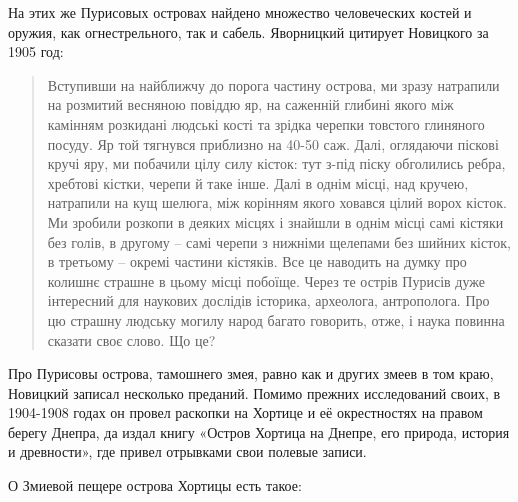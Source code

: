 На этих же Пурисовых островах найдено множество человеческих костей и оружия, как огнестрельного, так и сабель. Яворницкий цитирует Новицкого за 1905 год:

\begin{quotation}
Вступивши на найближчу до порога частину острова, ми зразу натрапили на розмитий весняною повіддю яр, на саженній глибині якого між камінням розкидані людські кості та зрідка черепки товстого глиняного посуду. Яр той тягнувся приблизно на 40-50 саж. Далі, оглядаючи піскові кручі яру, ми побачили цілу силу кісток: тут з-під піску обголились ребра, хребтові кістки, черепи й таке інше. Далі в однім місці, над кручею, натрапили на кущ шелюга, між корінням якого ховався цілий ворох кісток. Ми зробили розкопи в деяких місцях і знайшли в однім місці самі кістяки без голів, в другому – самі черепи з нижніми щелепами без шийних кісток, в третьому – окремі частини кістяків. Все це наводить на думку про колишнє страшне в цьому місці побоїще. Через те острів Пурисів дуже інтересний для наукових дослідів історика, археолога, антрополога. Про цю страшну людську могилу народ багато говорить, отже, і наука повинна сказати своє слово. Що це? 
\end{quotation}

Про Пурисовы острова, тамошнего змея, равно как и других змеев в том краю, Новицкий записал несколько преданий. Помимо прежних исследований своих, в 1904-1908 годах он провел раскопки на Хортице и её окрестностях на правом берегу Днепра, да издал книгу «Остров Хортица на Днепре, его природа, история и древности», где привел отрывками свои полевые записи.

О Змиевой пещере острова Хортицы есть такое: 

